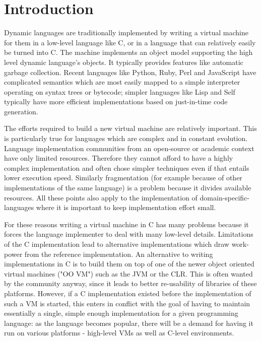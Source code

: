 \documentclass{llncs}
\begin{document}
\section{Introduction}

Dynamic languages are traditionally implemented by writing a virtual
machine for them in a low-level language like C, or in a language that
can relatively easily be turned into C.  The machine implements an
object model supporting the high level dynamic language's objects.  It
typically provides features like automatic garbage collection.  Recent
languages like Python, Ruby, Perl and JavaScript have complicated
semantics which are most easily mapped to a simple interpreter operating
on syntax trees or bytecode; simpler languages like Lisp and Self
typically have more efficient implementations based on just-in-time code
generation.

The efforts required to build a new virtual machine are relatively
important.  This is particularly true for languages which are complex
and in constant evolution. Language implementation communities from an
open-source or academic context have only limited resources. Therefore they
cannot afford to have a highly complex implementation and often chose simpler
techniques even if that entails lower execution speed. Similarly fragmentation
(for example because of other implementations of the same language) is a
problem because it divides available resources. All these points also apply to
the implementation of domain-specific-languages where it is important to keep
implementation effort small.

For these reasons writing a virtual machine in C has many problems because it
forces the language implementer to deal with many low-level details. Limitations
of the C implementation lead to alternative implementations which draw
work-power from the reference implementation. An alternative to writing
implementations in C is to build them on top of one of the newer object oriented
virtual machines ("OO VM") such as the JVM or the CLR. This is often wanted by
the community anyway, since it leads to better re-usability of libraries of
these platforms. However, if a C implementation existed before the
implementation of such a VM is started, this enters in conflict with the goal of
having to maintain essentially a single, simple enough implementation for a
given programming language: as the language becomes popular, there will be a
demand for having it run on various platforms - high-level VMs as well as
C-level environments.
\end{document}
